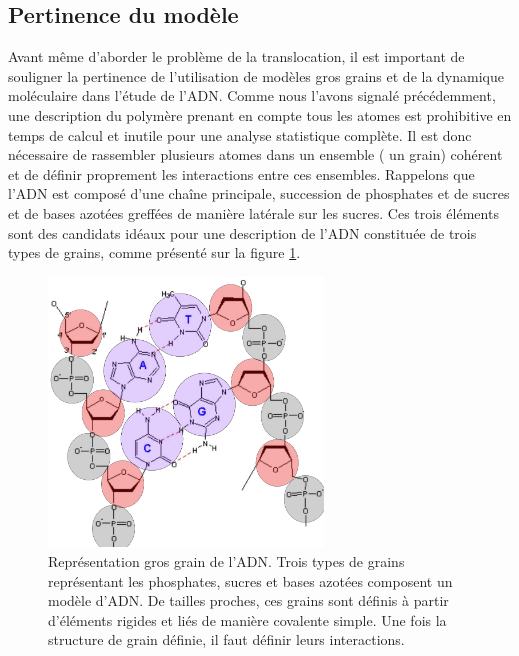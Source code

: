 \subsection{Pertinence du modèle}
Avant même d'aborder le problème de la translocation, il est important de souligner la pertinence de l'utilisation de modèles gros grains et de la dynamique moléculaire dans l'étude de l'ADN. Comme nous l'avons signalé précédemment, une description du polymère prenant en compte tous les atomes est prohibitive en temps de calcul et inutile pour une analyse statistique complète. Il est donc nécessaire de rassembler plusieurs atomes dans un ensemble ( un grain) cohérent et de définir proprement les interactions entre ces ensembles. Rappelons que l'ADN est composé d'une chaîne principale, succession de phosphates et de sucres et de bases azotées greffées de manière latérale sur les sucres. Ces trois éléments sont des candidats idéaux pour une description de l'ADN constituée de trois types de grains, comme présenté sur la figure \ref{coarsegraindna}.

\begin{figure}[H]
\begin{center}
\includegraphics[width=0.65\textwidth]{coarsegraining.png}

\caption[Modèle gros grains]{Représentation gros grain de l'ADN. Trois types de grains représentant les phosphates, sucres et bases azotées composent un modèle d'ADN. De tailles proches, ces grains sont définis à partir d'éléments rigides et liés de manière covalente simple. Une fois la structure de grain définie, il faut définir leurs interactions.}
\label{coarsegraindna}
\end{center}
\end{figure}


